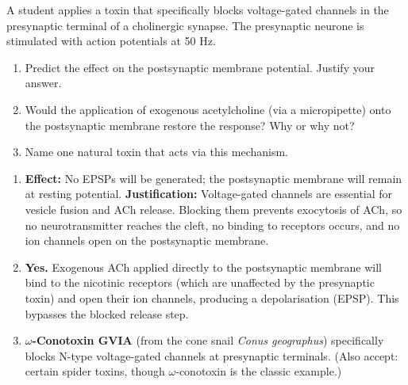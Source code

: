 \documentclass[11pt]{article}
\begin{document}
\begin{exercice}
A student applies a toxin that specifically blocks voltage-gated  channels in the presynaptic terminal of a cholinergic synapse. The presynaptic neurone is stimulated with action potentials at 50 Hz.
\begin{enumerate}
\item Predict the effect on the postsynaptic membrane potential. Justify your answer.
\item Would the application of exogenous acetylcholine (via a micropipette) onto the postsynaptic membrane restore the response? Why or why not?
\item Name one natural toxin that acts via this mechanism.
\end{enumerate}
\end{exercice}

\begin{corrige}
\begin{enumerate}
\item \textbf{Effect:} No EPSPs will be generated; the postsynaptic membrane will remain at resting potential. \textbf{Justification:} Voltage-gated  channels are essential for vesicle fusion and ACh release. Blocking them prevents exocytosis of ACh, so no neurotransmitter reaches the cleft, no binding to receptors occurs, and no ion channels open on the postsynaptic membrane.
\item \textbf{Yes.} Exogenous ACh applied directly to the postsynaptic membrane will bind to the nicotinic receptors (which are unaffected by the presynaptic toxin) and open their ion channels, producing a depolarisation (EPSP). This bypasses the blocked release step.
\item \textbf{$\omega$-Conotoxin GVIA} (from the cone snail \emph{Conus geographus}) specifically blocks N-type voltage-gated  channels at presynaptic terminals. (Also accept: certain spider toxins, though $\omega$-conotoxin is the classic example.)
\end{enumerate}
\end{corrige}
\end{document}
